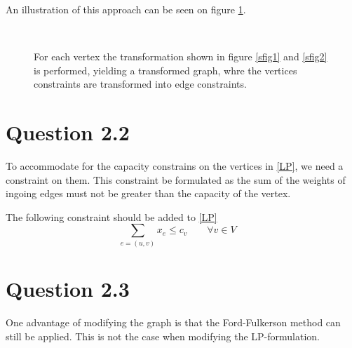 \documentclass[10pt]{article}
\begin{document}
An illustration of this approach can be seen on figure \ref{fig1}.

\begin{figure}[ht]
\centering
\mbox{
     \quad
}                    
\caption{For each vertex the transformation shown in figure \ref{sfig1} and \ref{sfig2} is performed, yielding a transformed graph, whre the vertices constraints are transformed into edge constraints.}
\label{fig1}
\end{figure}



\section*{Question 2.2} %
\label{sec:question_2_2}
To accommodate for the capacity constrains on the vertices in \eqref{LP}, we need a constraint on them.
This constraint be formulated as the sum of the weights of ingoing edges must not be greater than the capacity of the vertex.

The following constraint should be added to \eqref{LP}
\begin{equation}
	\sum_{e=(u,v)} x_e \leq c_v \qquad \forall v \in V \quad 
\end{equation} 

\section*{Question 2.3} %
\label{sec:question_2_3}
One advantage of modifying the graph is that the Ford-Fulkerson method can still be applied. This is not the case when modifying the LP-formulation.
\end{document}
